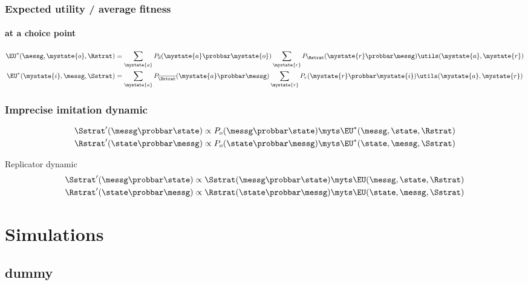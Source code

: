 \documentclass[fleqn,9pt,xcolor=dvipsnames]{beamer}
\begin{document}
\begin{frame}
  \frametitle{Expected utility / average fitness}
  \framesubtitle{at a choice point}

\begin{align*}
  \EU^*(\messg , \mystate{o}, \Rstrat) & = \sum_{\mystate{a}} P_{\overline{o}}(\mystate{a}
  \probbar \mystate{o}) \sum_{\mystate{r}} P_\Rstrat(\mystate{r} \probbar
  \messg) \utils(\mystate{a}, \mystate{r}) \\
  \EU^*(\mystate{i}, \messg, \Sstrat) & = \sum_{\mystate{a}} P_{\overline{\Sstrat}}(\mystate{a}
  \probbar \messg) \sum_{\mystate{r}} P_{r}(\mystate{r} \probbar \mystate{i})
  \utils(\mystate{a}, \mystate{r})
\end{align*}

\end{frame}


\begin{frame}
  \frametitle{Imprecise imitation dynamic}
  
  \begin{align*}
  \Sstrat'(\messg \probbar \state) & \propto P_o(\messg \probbar \state) \myts \EU^*(\messg,
  \state, \Rstrat)\\ 
  \Rstrat'(\state \probbar \messg) & \propto P_o(\state \probbar \messg)
  \myts \EU^*(\state, \messg, \Sstrat)
\end{align*}

\bigskip

\begin{block}{Replicator dynamic}
  \begin{align*}
    \Sstrat'(\messg \probbar \state) & \propto \Sstrat(\messg \probbar \state) \myts
    \EU(\messg, \state,\Rstrat) \\ \Rstrat'(\state \probbar \messg) & \propto \Rstrat(\state
    \probbar \messg) \myts \EU(\state, \messg,\Sstrat)
  \end{align*}
\end{block}

\end{frame}

\section{Simulations}
\subsection{dummy}
\end{document}
